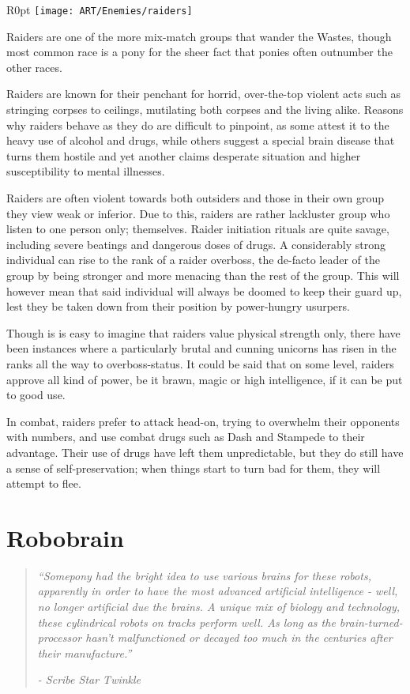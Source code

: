 \documentclass[11pt,a4paper,twocolumn]{book}
\begin{document}
	\begin{wrapfigure}{R}{0pt}
		\texttt{[image: ART/Enemies/raiders]}
	\end{wrapfigure}
	
	Raiders are one of the more mix-match groups that wander the Wastes, though most common race is a pony for the sheer fact that ponies often outnumber the other races.
	
	Raiders are known for their penchant for horrid, over-the-top violent acts such as stringing corpses to ceilings, mutilating both corpses and the living alike. Reasons why raiders behave as they do are difficult to pinpoint, as some attest it to the heavy use of alcohol and drugs, while others suggest a special brain disease that turns them hostile and yet another claims desperate situation and higher susceptibility to mental illnesses. 
	
	Raiders are often violent towards both outsiders and those in their own group they view weak or inferior. Due to this, raiders are rather lackluster group who listen to one person only; themselves. Raider initiation rituals are quite savage, including severe beatings and dangerous doses of drugs. 
	A considerably strong individual can rise to the rank of a raider overboss, the de-facto leader of the group by being stronger and more menacing than the rest of the group. This will however mean that said individual will always be doomed to keep their guard up, lest they be taken down from their position by power-hungry usurpers.
	
	Though is is easy to imagine that raiders value physical strength only, there have been instances where a particularly brutal and cunning unicorns has risen in the ranks all the way to overboss-status. It could be said that on some level, raiders approve all kind of power, be it brawn, magic or high intelligence, if it can be put to good use.
	
	In combat, raiders prefer to attack head-on, trying to overwhelm their opponents with numbers, and use combat drugs such as Dash and Stampede to their advantage. Their use of drugs have left them unpredictable, but they do still have a sense of self-preservation; when things start to turn bad for them, they will attempt to flee.
	
	\clearpage
	
	\section*{Robobrain}
	\begin{quote}
		\emph{``Somepony had the bright idea to use various brains for these robots, apparently in order to have the most advanced artificial intelligence - well, no longer artificial due the brains. A unique mix of biology and technology, these cylindrical robots on tracks perform well. As long as the brain-turned-processor hasn't malfunctioned or decayed too much in the centuries after their manufacture.''}
		
		\emph{-	Scribe Star Twinkle}
	\end{quote}
	
\end{document}
